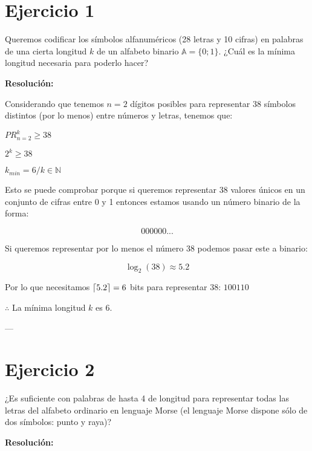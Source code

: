 \documentclass{article}
\title{
    \author{Rodrigo José Alva Sáenz}
    \date{\small \today}
}
\DeclarePairedDelimiter\ceil{\lceil}{\rceil}
\begin{document}
\maketitle %

\newcommand{\Ejercicio}[2]{
    \section*{Ejercicio #1}

    {#2}

    \bigskip
    \textbf{Resolución:}
    \bigskip
}

\newpage

\Ejercicio{1}{
    Queremos codificar los símbolos alfanuméricos (28 letras y 10 cifras) en palabras de una cierta longitud $k$ de un alfabeto binario $\mathbb{A} = \{0; 1\}$. ¿Cuál es la mínima longitud necesaria para poderlo hacer?
}

Considerando que tenemos $n=2$ dígitos posibles para representar 38 símbolos distintos (por lo menos) entre números y letras, tenemos que:

\begin{center}
    $PR_{n=2}^{k} \geq 38$

    \medskip

    $2^k \geq 38$

    \medskip

    $k_{min} = 6 / k \in \mathbb{N}$
\end{center}

Esto se puede comprobar porque si queremos representar 38 valores únicos en un conjunto de cifras entre 0 y 1 entonces estamos usando un número binario de la forma:

$$000000...$$

Si queremos representar por lo menos el número 38 podemos pasar este a binario:

$$\log_2(38) \approx 5.2$$

Por lo que necesitamos $\ceil{5.2} = 6$ bits para representar 38: $100110$

\bigskip

$\therefore$ La mínima longitud $k$ es 6.

---

\Ejercicio{2}{
    ¿Es suficiente con palabras de hasta 4 de longitud para representar todas las letras del alfabeto ordinario en lenguaje Morse (el lenguaje Morse dispone sólo de dos símbolos: punto y raya)?
}
\end{document}
